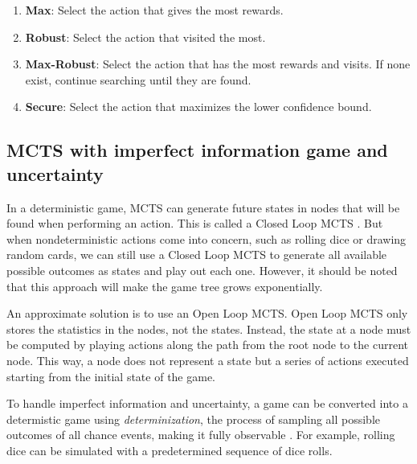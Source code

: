 \begin{enumerate}
  \item \textbf{Max}: Select the action that gives the most rewards.
  \item \textbf{Robust}: Select the action that visited the most. 
  \item \textbf{Max-Robust}: Select the action that has the most rewards and visits. If none exist, continue searching until they are found.
  \item \textbf{Secure}: Select the action that maximizes the lower confidence bound.
\end{enumerate}


\subsection{MCTS with imperfect information game and uncertainty} \label{handling-uncertainty}

In a deterministic game, MCTS can generate future states in nodes that will be found when performing an action. This is called a Closed Loop MCTS \cite{Perez_Liebana_2015}. But when nondeterministic actions come into concern, such as rolling dice or drawing random cards, we can still use a Closed Loop MCTS to generate all available possible outcomes as states and play out each one. However, it should be noted that this approach will make the game tree grows exponentially. 

An approximate solution is to use an Open Loop MCTS. Open Loop MCTS only stores the statistics in the nodes, not the states. Instead, the state at a node must be computed by playing actions along the path from the root node to the current node. This way, a node does not represent a state but a series of actions executed starting from the initial state of the game.

To handle imperfect information and uncertainty, a game can be converted into a determistic game using \textit{determinization}, the process of sampling all possible outcomes of all chance events, making it fully observable \cite{mcts-survey}. For example, rolling dice can be simulated with a predetermined sequence of dice rolls.


